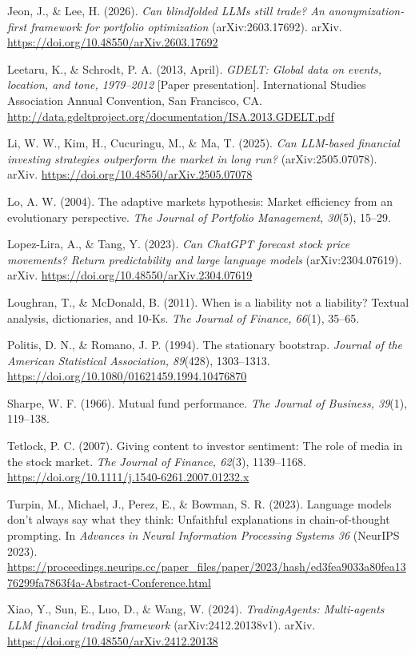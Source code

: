 \documentclass[
  12pt,
]{article}
\begin{document}
Jeon, J., \& Lee, H. (2026). \emph{Can blindfolded LLMs still trade? An
anonymization-first framework for portfolio optimization}
(arXiv:2603.17692). arXiv.
\url{https://doi.org/10.48550/arXiv.2603.17692}

Leetaru, K., \& Schrodt, P. A. (2013, April). \emph{GDELT: Global data
on events, location, and tone, 1979--2012} {[}Paper presentation{]}.
International Studies Association Annual Convention, San Francisco, CA.
\url{http://data.gdeltproject.org/documentation/ISA.2013.GDELT.pdf}

Li, W. W., Kim, H., Cucuringu, M., \& Ma, T. (2025). \emph{Can LLM-based
financial investing strategies outperform the market in long run?}
(arXiv:2505.07078). arXiv.
\url{https://doi.org/10.48550/arXiv.2505.07078}

Lo, A. W. (2004). The adaptive markets hypothesis: Market efficiency
from an evolutionary perspective. \emph{The Journal of Portfolio
Management, 30}(5), 15--29.

Lopez-Lira, A., \& Tang, Y. (2023). \emph{Can ChatGPT forecast stock
price movements? Return predictability and large language models}
(arXiv:2304.07619). arXiv.
\url{https://doi.org/10.48550/arXiv.2304.07619}

Loughran, T., \& McDonald, B. (2011). When is a liability not a
liability? Textual analysis, dictionaries, and 10-Ks. \emph{The Journal
of Finance, 66}(1), 35--65.

Politis, D. N., \& Romano, J. P. (1994). The stationary bootstrap.
\emph{Journal of the American Statistical Association, 89}(428),
1303--1313. \url{https://doi.org/10.1080/01621459.1994.10476870}

Sharpe, W. F. (1966). Mutual fund performance. \emph{The Journal of
Business, 39}(1), 119--138.

Tetlock, P. C. (2007). Giving content to investor sentiment: The role of
media in the stock market. \emph{The Journal of Finance, 62}(3),
1139--1168. \url{https://doi.org/10.1111/j.1540-6261.2007.01232.x}

Turpin, M., Michael, J., Perez, E., \& Bowman, S. R. (2023). Language
models don't always say what they think: Unfaithful explanations in
chain-of-thought prompting. In \emph{Advances in Neural Information
Processing Systems 36} (NeurIPS 2023).
\url{https://proceedings.neurips.cc/paper_files/paper/2023/hash/ed3fea9033a80fea1376299fa7863f4a-Abstract-Conference.html}

Xiao, Y., Sun, E., Luo, D., \& Wang, W. (2024). \emph{TradingAgents:
Multi-agents LLM financial trading framework} (arXiv:2412.20138v1).
arXiv. \url{https://doi.org/10.48550/arXiv.2412.20138}
\end{document}
